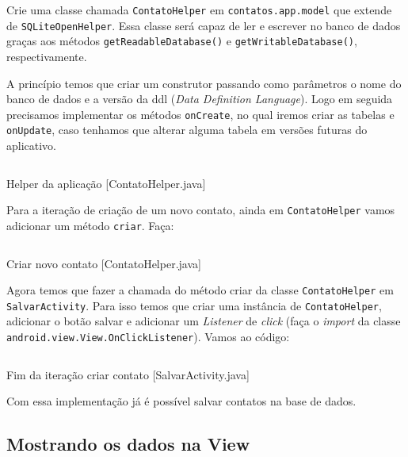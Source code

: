 Crie uma classe chamada \texttt{ContatoHelper} em
\texttt{contatos.app.model} que extende de \texttt{SQLiteOpenHelper}.
Essa classe será capaz de ler e escrever no banco de dados graças aos
métodos \texttt{getReadableDatabase()} e \texttt{getWritableDatabase()},
respectivamente.

A princípio temos que criar um construtor passando como parâmetros o
nome do banco de dados e a versão da \gls{ddl} (\emph{Data Definition
Language}). Logo em seguida precisamos implementar os métodos
\texttt{onCreate}, no qual iremos criar as tabelas e \texttt{onUpdate},
caso tenhamos que alterar alguma tabela em versões futuras do
aplicativo.

\begin{listing}[H]
  \inputminted[linenos=true,frame=bottomline,tabsize=3]{ java }{ source/ContatoHelper-1.java }
  \caption{Helper da aplicação [ContatoHelper.java]}
\end{listing}

Para a iteração de criação de um novo contato, ainda em
\texttt{ContatoHelper} vamos adicionar um método \texttt{criar}. Faça:

\begin{listing}[H]
  \inputminted[linenos=true,frame=bottomline,tabsize=3]{ java }{ source/ContatoHelper-2.java }
  \caption{Criar novo contato [ContatoHelper.java]}
\end{listing}

Agora temos que fazer a chamada do método criar da classe
\texttt{ContatoHelper} em \texttt{SalvarActivity}. Para isso temos que
criar uma instância de \texttt{ContatoHelper}, adicionar o botão salvar
e adicionar um \emph{Listener} de \emph{click} (faça o \emph{import} da
classe \newline
\texttt{android.view.View.OnClickListener}). Vamos ao código:

\begin{listing}[H]
  \inputminted[linenos=true,frame=bottomline,tabsize=3]{ java }{ source/SalvarActivity-2.java }
  \caption{Fim da iteração criar contato [SalvarActivity.java]}
\end{listing}

Com essa implementação já é possível salvar contatos na base de dados.

\subsection{Mostrando os dados na View \label{ssec:listview}}

